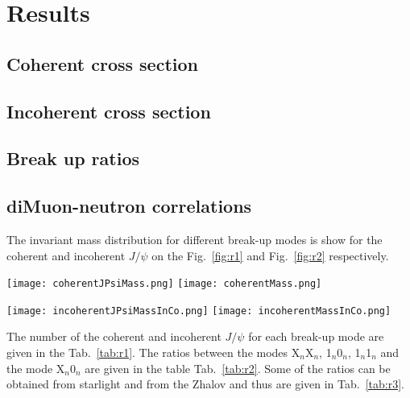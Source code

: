 \chapter{Results} 
  \section{Coherent cross section}
  \section{Incoherent cross section}
  \section{Break up ratios}
  \section{diMuon-neutron correlations}
    The invariant mass distribution for different break-up modes is show for the coherent and incoherent $J/\psi$ on the Fig.~\ref{fig:r1} and Fig.~\ref{fig:r2} respectively. 
    \begin{figure*}[!Hhtb]
      \begin{center}
        \texttt{[image: coherentJPsiMass.png]}
        \texttt{[image: coherentMass.png]}
        \caption{
          \label{fig:r1}  
          Invariant mass spectrum of the opposite signs di-muons originating from the coherent $J/\psi$ for $X_{n}0_{n}$ breakup mode for two invariant mass regions.  
        }
      \end{center}
    \end{figure*}
    
    \begin{figure*}[!Hhtb]
      \begin{center}
        \texttt{[image: incoherentJPsiMassInCo.png]}
            \texttt{[image: incoherentMassInCo.png]}
    
    
                 \caption{
        \label{fig:r2}  
         Invariant mass spectrum of the opposite signs di-muons originating from the incoherent $J/\psi$  for $X_{n}0_{n}$ breakup mode for two invariant mass regions.   
            }
         
      \end{center}
    \end{figure*}
    
    The number of the coherent and incoherent $J/\psi$ for each break-up mode are
      given in the Tab.~\ref{tab:r1}. 
    The ratios between the modes X$_{n}$X$_{n}$, 1$_{n}$0$_{n}$, 1$_{n}$1$_{n}$ and
      the mode  X$_{n}$0$_{n}$ are given in the table Tab.~\ref{tab:r2}. 
    Some of the  ratios can be obtained from  {\sc starlight} and from the Zhalov 
      and thus are given in Tab.~\ref{tab:r3}.
    
